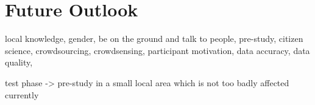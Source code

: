 
\section{Future Outlook}

local knowledge, gender, be on the ground and talk to people, pre-study, citizen science, crowdsourcing, crowdsensing, participant motivation, data accuracy, data quality,

test phase -> pre-study in a small local area which is not too badly affected currently 
